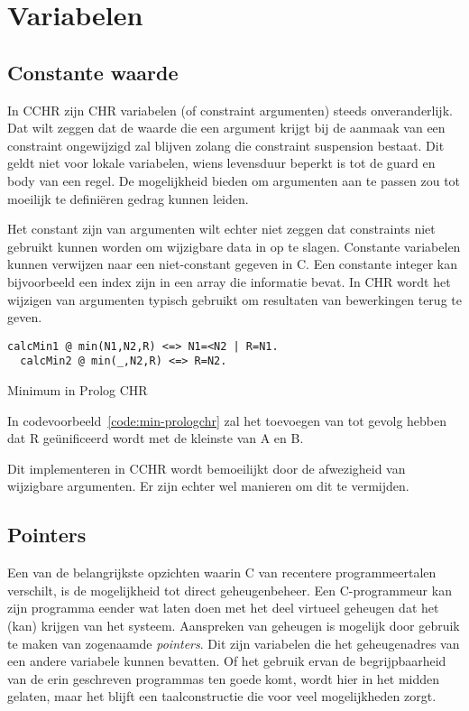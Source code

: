 \section{Variabelen} \label{sec:taal-var}

\subsection{Constante waarde}

In CCHR zijn CHR variabelen (of constraint argumenten) steeds onveranderlijk. Dat wilt zeggen dat de waarde die een argument krijgt bij de aanmaak van een constraint ongewijzigd zal blijven zolang die constraint suspension bestaat. Dit geldt niet voor lokale variabelen, wiens levensduur beperkt is tot de guard en body van een regel. De mogelijkheid bieden om argumenten aan te passen zou tot moeilijk te defini\"eren gedrag kunnen leiden.

Het constant zijn van argumenten wilt echter niet zeggen dat constraints niet gebruikt kunnen worden om wijzigbare data in op te slagen. Constante variabelen kunnen verwijzen naar een niet-constant gegeven in C. Een constante integer kan bijvoorbeeld een index zijn in een array die informatie bevat. In CHR wordt het wijzigen van argumenten typisch gebruikt om resultaten van bewerkingen terug te geven.
\begin{exCode}
\begin{Verbatim}[frame=single]
  calcMin1 @ min(N1,N2,R) <=> N1=<N2 | R=N1.
  calcMin2 @ min(_,N2,R) <=> R=N2.
\end{Verbatim}
\caption{Minimum in Prolog CHR}
\label{code:min-prologchr}
\end{exCode}
In codevoorbeeld~\ref{code:min-prologchr} zal het toevoegen van  tot gevolg hebben dat R ge\"unificeerd wordt met de kleinste van A en B.

Dit implementeren in CCHR wordt bemoeilijkt door de afwezigheid van wijzigbare argumenten. Er zijn echter wel manieren om dit te vermijden.

\subsection{Pointers}

Een van de belangrijkste opzichten waarin C van recentere programmeertalen verschilt, is de mogelijkheid tot direct geheugenbeheer. Een C-programmeur kan zijn programma eender wat laten doen met het deel virtueel geheugen dat het (kan) krijgen van het systeem. Aanspreken van geheugen is mogelijk door gebruik te maken van zogenaamde {\em pointers}. Dit zijn variabelen die het geheugenadres van een andere variabele kunnen bevatten. Of het gebruik ervan de begrijpbaarheid van de erin geschreven programmas ten goede komt, wordt hier in het midden gelaten, maar het blijft een taalconstructie die voor veel mogelijkheden zorgt.

